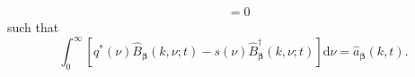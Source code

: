 \begin{equation}
\begin{split}
&= 0
\end{split}
\end{equation}
such that
\begin{equation}
\int_0^\infty\left[q^*(\nu)\hat{B}_{\bm{\beta}}(k,\nu;t) - s(\nu)\hat{B}_{\bm{\beta}}^\dagger(k,\nu;t)\right]\mathrm{d}\nu = \hat{a}_{\bm{\beta}}(k,t).
\end{equation}

